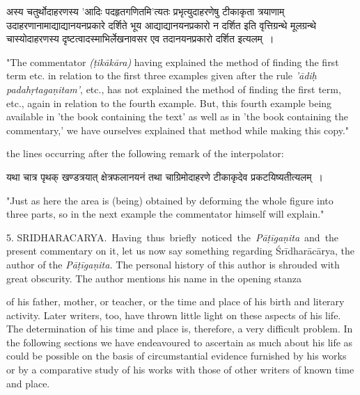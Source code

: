 \documentclass[10pt, openany]{book}
\begin{document}
{\qt अस्य चतुर्थोदाहरणस्य 'आदिः पदहृतगणितमि'त्यतः प्रभृत्युदाहरणेषु टीकाकृता 
{त्रयाणाम् उदाहरणानामाद्याद्यानयनप्रकारे दर्शिते भूय आद्याद्यानयनप्रकारो न
दर्शित इति}
{वृत्तिग्रन्थे मूलग्रन्थे चास्योदाहरणस्य दृष्टत्वादस्माभिर्लेखनावसर एव
तदानयनप्रकारो दर्शित}
{इत्यलम्~।}}

 {\eqt "The commentator \textit{(ṭikākāra) }having explained the method of finding the first term etc. in relation to the first three
{examples given after the rule \textit{'ādiḥ padahṛtagaṇitam'}, etc., has}
{not explained the method of finding the first term, etc., again}
{in relation to the fourth example. But, this fourth example being available in 'the book containing the text' as well as in}
{'the book containing the commentary,' we have ourselves}
{explained that method while making this copy."}
\vspace{3mm}

{the lines occurring after the following remark of the interpolator:}}
\vspace{3mm}

{\qt यथा चात्र पृथक् खण्डत्रयात् क्षेत्रफलानयनं तथा चाग्रिमोदाहरणे
टीकाकृदेव प्रकटयिष्यतीत्यलम्~।}

 {\eqt "Just as here the area is (being) obtained by deforming the whole figure into three parts, so in the next example
{the commentator himself will explain."}}
\vspace{4mm}

{5. SRIDHARACARYA. \,Having \,thus \,briefly \,noticed \,the \,\textit{Pāṭīgaṇita} \,and \,the present commentary on it, let us now say}
{something regarding Śrīdharācārya, the author of the \textit{Pāṭīgaṇita.}}
{The personal history of this author is shrouded with great obscurity. The author mentions his name in the opening stanza}

\newpage

\justify{}
{of his father, mother, or teacher, or the time and place of his}
{birth and literary activity. Later writers, too, have thrown}
{little light on these aspects of his life. The determination of his}
{time and place is, therefore, a very difficult problem. In the}
{following sections we have endeavoured to ascertain as much}
{about his life as could be possible on the basis of circumstantial}
{evidence furnished by his works or by a comparative study of}
{his works with those of other writers of known time and}
{place.}
\vspace{3mm}
\end{document}
